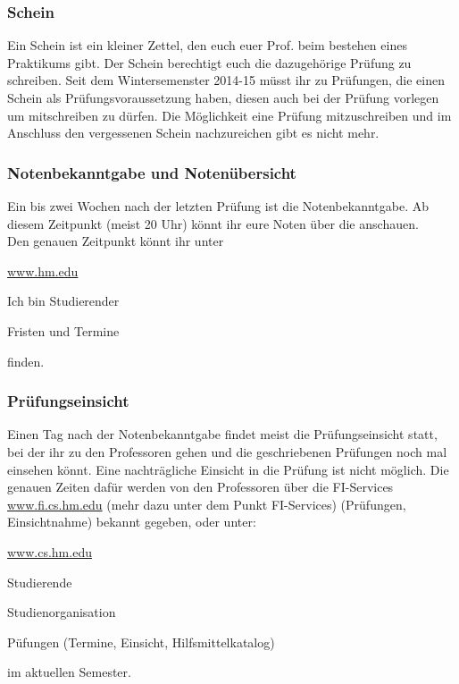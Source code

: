 \subsubsection{Schein}
Ein Schein ist ein kleiner Zettel, den euch euer Prof. beim bestehen eines Praktikums gibt. Der Schein berechtigt euch die dazugehörige Prüfung zu schreiben.
Seit dem Wintersemenster 2014-15 müsst ihr zu Prüfungen, die einen Schein als Prüfungsvoraussetzung haben, diesen auch bei der Prüfung vorlegen um mitschreiben zu dürfen. Die Möglichkeit eine Prüfung mitzuschreiben und im Anschluss den vergessenen Schein nachzureichen gibt es nicht mehr.

\subsubsection{Notenbekanntgabe und Notenübersicht}

Ein bis zwei Wochen nach der letzten Prüfung ist die Notenbekanntgabe. Ab diesem Zeitpunkt (meist 20 Uhr) könnt ihr eure Noten über die  anschauen.\\
Den genauen Zeitpunkt könnt ihr unter
\begin{sitenav}
	\item\url{www.hm.edu}
	\item Ich bin Studierender
	\item Fristen und Termine
\end{sitenav}
finden.

\subsubsection{Prüfungseinsicht}

Einen Tag nach der Notenbekanntgabe findet meist die Prüfungseinsicht statt, bei der ihr zu den Professoren gehen und die geschriebenen Prüfungen noch mal einsehen könnt. Eine nachträgliche Einsicht in die Prüfung ist nicht möglich. Die genauen Zeiten dafür werden von den Professoren über die FI-Services \url{www.fi.cs.hm.edu} (mehr dazu unter dem Punkt FI-Services) (Prüfungen, Einsichtnahme) bekannt gegeben, oder unter:\doublebreak
\begin{sitenav}
	\item \url{www.cs.hm.edu}
	\item Studierende
	\item Studienorganisation
	\item Püfungen (Termine, Einsicht, Hilfsmittelkatalog)
\end{sitenav} im aktuellen Semester.


